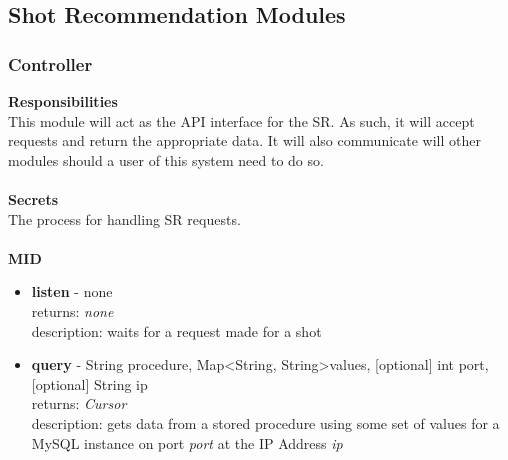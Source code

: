 \documentclass[11pt]{article}
\begin{document}
\subsection{Shot Recommendation Modules} %
\subsubsection*{Controller}
\textbf{Responsibilities} \\
This module will act as the API interface for the SR. As such, it will accept requests and return the appropriate data. It will also communicate will other modules should a user of this system need to do so. \\ \\
\textbf{Secrets} \\
The process for handling SR requests. \\ \\
\textbf{MID}
\begin{itemize}
\item \textbf{listen} - none \\ returns: \textit{none} \\ description: waits for a request made for a shot
\item \textbf{query} - String procedure, Map\textless String, String\textgreater values, [optional] int port, [optional] String ip \\ returns: \textit{Cursor} \\ description: gets data from a stored procedure using some set of values for a MySQL instance on port \textit{port} at the IP Address \textit{ip}
\end{itemize}
\end{document}
